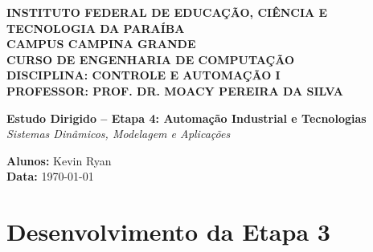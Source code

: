\documentclass[12pt]{article}
\begin{document}
\begin{center}
    \begin{minipage}{0.2\textwidth}
    \end{minipage}
    \begin{minipage}{0.75\textwidth}
        \begin{center}
            \small\textbf{INSTITUTO FEDERAL DE EDUCAÇÃO, CIÊNCIA E TECNOLOGIA DA PARAÍBA} \\
            \small\textbf{CAMPUS CAMPINA GRANDE} \\
            \small\textbf{CURSO DE ENGENHARIA DE COMPUTAÇÃO} \\
            \small\textbf{DISCIPLINA: CONTROLE E AUTOMAÇÃO I} \\
            \small\textbf{PROFESSOR: PROF. DR. MOACY PEREIRA DA SILVA} \\
        \end{center}
    \end{minipage}
\end{center}

\hr
\vspace{0.5cm}

\begin{center}
    \Large{\textbf{Estudo Dirigido -- Etapa 4: Automação Industrial e Tecnologias}} \\
    \large{\textit{Sistemas Dinâmicos, Modelagem e Aplicações}} \\
    \vspace{0.6cm}

    \large{\textbf{Alunos:} Kevin Ryan} \\
    \large{\textbf{Data:} \today} \\
\end{center}

\vspace{0.8cm}


\section{Desenvolvimento da Etapa 3}
\end{document}
